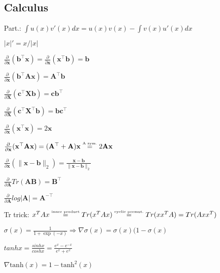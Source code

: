 \subsection*{Calculus}
\begin{inparaitem}[\color{black}\textbullet]
	\item Part.: $\int u(x)v'(x) dx = u(x)v(x) - \int v(x)u'(x) dx$\\
	\item $|x|'=x/|x|$ \quad
	\item $\frac{\partial}{\partial \mathbf{x}}(\mathbf{b}^\top \mathbf{x}) = \frac{\partial}{\partial \mathbf{x}}(\mathbf{x}^\top \mathbf{b}) = \mathbf{b}$\\
	\item $\frac{\partial}{\partial \mathbf{x}}(\mathbf{b}^\top \mathbf{A}\mathbf{x}) = \mathbf{A}^\top \mathbf{b}$ \quad
	\item $\frac{\partial}{\partial \mathbf{X}}(\mathbf{c}^\top \mathbf{X} \mathbf{b}) = \mathbf{c}\mathbf{b}^\top$\\
	\item $\frac{\partial}{\partial \mathbf{X}}(\mathbf{c}^\top \mathbf{X}^\top \mathbf{b}) = \mathbf{b}\mathbf{c}^\top$
	\item $\frac{\partial}{\partial \mathbf{x}}(\mathbf{x}^\top \mathbf{x}) = 2\mathbf{x}$\\
	\item $\frac{\partial}{\partial \mathbf{x}}(\mathbf{x}^\top \mathbf{A}\mathbf{x}) = (\mathbf{A}^\top + \mathbf{A})\mathbf{x} \stackrel{\text{\tiny A sym.}}{=} 2\mathbf{A}\mathbf{x}$ \\
	\item $\frac{\partial}{\partial \mathbf{x}}(\| \mathbf{x}-\mathbf{b} \|_2) = \frac{\mathbf{x}-\mathbf{b}}{\|\mathbf{x}-\mathbf{b}\|_2}$
	\item $\tfrac{\partial}{\partial \mathbf{A}} Tr(\mathbf{AB}) {=} \mathbf{B}^\top$
	\item $\frac{\partial}{\partial \mathbf{A}} log|\mathbf{A}| {=} \mathbf{A}^{-\top}$
	\item Tr trick: $x^T A x \stackrel{\text{\tiny inner product}}{=} Tr(x^T A x) \stackrel{\text{\tiny cyclic permut.}}{=} Tr(x x^T A) = Tr(A x x^T)$\\
	\item $\sigma(x) = \frac{1}{1+\exp(-x)} \Rightarrow \nabla \sigma(x)=\sigma(x)(1-\sigma(x) $ \\
	\item $tanhx {=} \frac{sinhx}{coshx} {=} \frac{e^{x}-e^{-x}}{e^{x} + e^{x}}$
	\item $\nabla \text{tanh}(x) = 1-\text{tanh}^2(x)$ 

\end{inparaitem}

